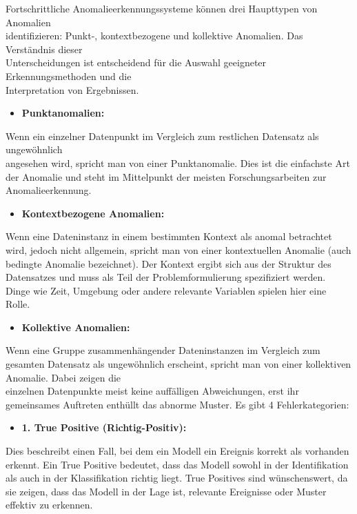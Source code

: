   \nAbsatz
Fortschrittliche Anomalieerkennungssysteme können drei Haupttypen von Anomalien \\ identifizieren: Punkt-, kontextbezogene und kollektive Anomalien. Das Verständnis dieser \\ Unterscheidungen ist entscheidend für die Auswahl geeigneter Erkennungsmethoden und die \\ Interpretation von Ergebnissen\cite{LOF}. 
\begin{itemize} \item \textbf{Punktanomalien:} \end{itemize} Wenn ein einzelner Datenpunkt im Vergleich zum restlichen Datensatz als ungewöhnlich \\ angesehen wird, spricht man von einer Punktanomalie\cite{LOF}. Dies ist die einfachste Art der Anomalie und steht im Mittelpunkt der meisten Forschungsarbeiten zur Anomalieerkennung.

\begin{itemize} \item \textbf{Kontextbezogene Anomalien:} \end{itemize} Wenn eine Dateninstanz in einem bestimmten Kontext als anomal betrachtet wird, jedoch nicht allgemein, spricht man von einer kontextuellen Anomalie (auch bedingte Anomalie bezeichnet). Der Kontext ergibt sich aus der Struktur des Datensatzes und muss als Teil der Problemformulierung spezifiziert werden\cite{LOF}. Dinge wie Zeit, Umgebung oder andere relevante Variablen spielen hier eine Rolle. \\
\begin{itemize} \item \textbf{Kollektive Anomalien:} \end{itemize} Wenn eine Gruppe zusammenhängender Dateninstanzen im Vergleich zum gesamten Datensatz als ungewöhnlich erscheint, spricht man von einer kollektiven Anomalie. Dabei zeigen die \\einzelnen Datenpunkte meist keine auffälligen Abweichungen, erst ihr gemeinsames Auftreten enthüllt das abnorme Muster\cite{LOF}. \nAbsatz
Es gibt 4 Fehlerkategorien: \\
\begin{itemize} \item \textbf{1. True Positive (Richtig-Positiv):} \end{itemize}
Dies beschreibt einen Fall, bei dem ein Modell ein Ereignis korrekt als vorhanden erkennt. Ein True Positive bedeutet, dass das Modell sowohl in der Identifikation als auch in der Klassifikation richtig liegt.
True Positives sind wünschenswert, da sie zeigen, dass das Modell in der Lage ist, relevante Ereignisse oder Muster effektiv zu erkennen\cite{Fehlerkategorie}.


